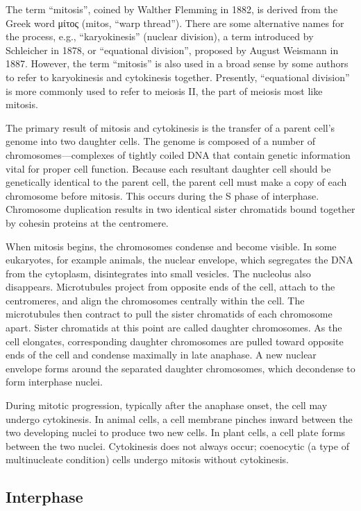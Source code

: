 The term ``mitosis'', coined by Walther Flemming in 1882, is derived from the Greek word μίτος (mitos, ``warp thread''). There are some alternative names for the process, e.g., ``karyokinesis'' (nuclear division), a term introduced by Schleicher in 1878, or ``equational division'', proposed by August Weismann in 1887. However, the term ``mitosis'' is also used in a broad sense by some authors to refer to karyokinesis and cytokinesis together. Presently, ``equational division'' is more commonly used to refer to meiosis II, the part of meiosis most like mitosis.

The primary result of mitosis and cytokinesis is the transfer of a parent cell's genome into two daughter cells. The genome is composed of a number of chromosomes---complexes of tightly coiled DNA that contain genetic information vital for proper cell function. Because each resultant daughter cell should be genetically identical to the parent cell, the parent cell must make a copy of each chromosome before mitosis. This occurs during the S phase of interphase. Chromosome duplication results in two identical sister chromatids bound together by cohesin proteins at the centromere.

When mitosis begins, the chromosomes condense and become visible. In some eukaryotes, for example animals, the nuclear envelope, which segregates the DNA from the cytoplasm, disintegrates into small vesicles. The nucleolus also disappears. Microtubules project from opposite ends of the cell, attach to the centromeres, and align the chromosomes centrally within the cell. The microtubules then contract to pull the sister chromatids of each chromosome apart. Sister chromatids at this point are called daughter chromosomes. As the cell elongates, corresponding daughter chromosomes are pulled toward opposite ends of the cell and condense maximally in late anaphase. A new nuclear envelope forms around the separated daughter chromosomes, which decondense to form interphase nuclei.

During mitotic progression, typically after the anaphase onset, the cell may undergo cytokinesis. In animal cells, a cell membrane pinches inward between the two developing nuclei to produce two new cells. In plant cells, a cell plate forms between the two nuclei. Cytokinesis does not always occur; coenocytic (a type of multinucleate condition) cells undergo mitosis without cytokinesis.

\hypertarget{interphase}{%
\subsection{Interphase}\label{interphase}}

